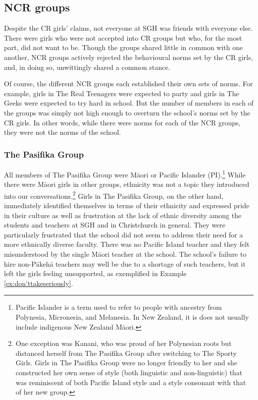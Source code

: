   

\subsection{NCR groups}
\largerpage[-1]
Despite the CR girls' claims, not everyone at SGH was friends with everyone else. There were girls who were not accepted into CR groups but who, for the most part, did not want to be. Though the groups shared little in common with one another, NCR groups actively rejected the behavioural norms set by the CR girls, and, in doing so, unwittingly shared a common stance. 
 

Of course, the different NCR groups each established their own sets of norms. For example, girls in The Real Teenagers were expected to party and girls in The Geeks were expected to try hard in school. But the number of members in each of the groups was simply not high enough to overturn the school's norms set by the CR girls. In other words, while there were norms for each of the NCR groups, they were not the norms of the school.

\subsubsection{The Pasifika Group}

All members of The Pasifika Group were M\=aori or Pacific Islander (PI).\footnote{Pacific Islander is a term used to refer to people with ancestry from Polynesia, Micronesia, and Melanesia. In New Zealand, it is does not usually include indigenous New Zealand M\=aori.} While there were M\=aori girls in other groups, ethnicity was not a topic they introduced into our conversations.\footnote{One exception was Kanani, who was proud of her Polynesian roots but distanced herself from The Pasifika Group after switching to The Sporty Girls. Girls in The Pasifika Group were no longer friendly to her and she constructed her own sense of style (both linguistic and non-linguistic) that was reminiscent of both Pacific Island style and a style consonant with that of her new group.}  Girls in The Pasifika Group, on the other hand, immediately identified themselves in terms of their ethnicity and expressed pride in their culture as well as frustration at the lack of ethnic diversity among the students and teachers at SGH and in Christchurch in general. They were particularly frustrated that the school did not seem to address their need for a more ethnically diverse faculty. There was no Pacific Island teacher and they felt misunderstood by the single M\=aori teacher at the school.  The school's failure to hire non-P\=akeh\=a teachers may well be due to a shortage of such teachers, but it left the girls feeling unsupported, as exemplified in Example \ref{ex:don'ttakeseriously}.
  
